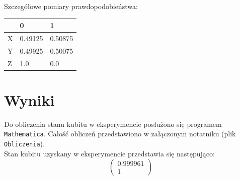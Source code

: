\documentclass{article}
\begin{document}
Szczegółowe pomiary prawdopodobieństwa:\\
\begin{center}
\begin{tabular}{l|l|l|}
\cline{2-3}
                        & 0       & 1       \\ \hline
\multicolumn{1}{|l|}{X} & 0.49125 & 0.50875 \\ \hline
\multicolumn{1}{|l|}{Y} & 0.49925 & 0.50075 \\ \hline
\multicolumn{1}{|l|}{Z} & 1.0     & 0.0     \\ \hline
\end{tabular}
\end{center}
\section{Wyniki}
Do obliczenia stanu kubitu w eksperymencie posłużono się programem \verb+Mathematica+. Całość obliczeń przedstawiono w załączonym notatniku (plik \verb+Obliczenia+).\\
Stan kubitu uzyskany w eksperymencie przedstawia się następująco:
$$ \left(\begin{matrix}
0.999961 \\
1
\end{matrix}\right)$$
\end{document}
